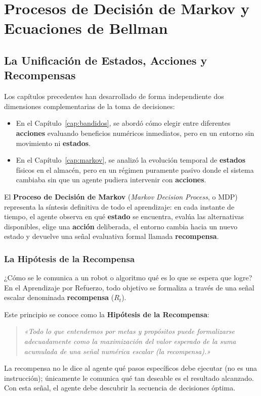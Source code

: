 \chapter{Procesos de Decisión de Markov y Ecuaciones de Bellman}
\label{cap:mdp}

\section{La Unificación de Estados, Acciones y Recompensas}
Los capítulos precedentes han desarrollado de forma independiente dos dimensiones complementarias de la toma de decisiones:
\begin{itemize}
  \item En el Capítulo~\ref{cap:bandidos}, se abordó cómo elegir entre diferentes \textbf{acciones} evaluando beneficios numéricos inmediatos, pero en un entorno sin movimiento ni \textbf{estados}.
  \item En el Capítulo~\ref{cap:markov}, se analizó la evolución temporal de \textbf{estados} físicos en el almacén, pero en un régimen puramente pasivo donde el sistema cambiaba sin que un agente pudiera intervenir con \textbf{acciones}.
\end{itemize}

El \textbf{Proceso de Decisión de Markov} (\textit{Markov Decision Process}, o MDP) representa la síntesis definitiva de todo el aprendizaje: en cada instante de tiempo, el agente observa en qué \textbf{estado} se encuentra, evalúa las alternativas disponibles, elige una \textbf{acción} deliberada, el entorno cambia hacia un nuevo estado y devuelve una señal evaluativa formal llamada \textbf{recompensa}.

\subsection{La Hipótesis de la Recompensa}
¿Cómo se le comunica a un robot o algoritmo qué es lo que se espera que logre? En el Aprendizaje por Refuerzo, todo objetivo se formaliza a través de una señal escalar denominada \textbf{recompensa} ($R_t$).

Este principio se conoce como la \textbf{Hipótesis de la Recompensa}:
\begin{quote}
  \textit{«Todo lo que entendemos por metas y propósitos puede formalizarse adecuadamente como la maximización del valor esperado de la suma acumulada de una señal numérica escalar (la recompensa).»}
\end{quote}
La recompensa no le dice al agente qué pasos específicos debe ejecutar (no es una instrucción); únicamente le comunica qué tan deseable es el resultado alcanzado. Con esta señal, el agente debe descubrir la secuencia de decisiones óptima.

